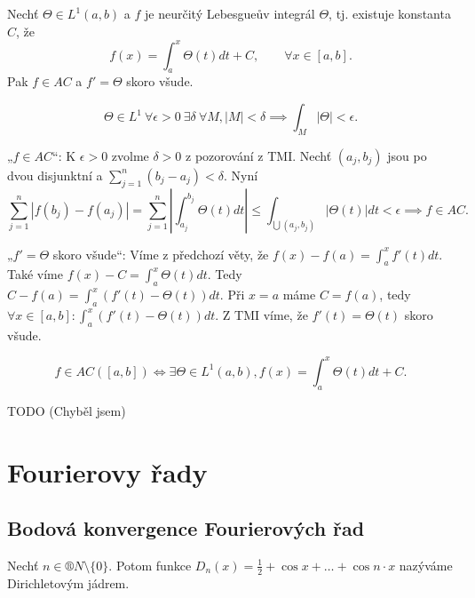 \documentclass[12pt]{article}					%
\begin{document}
	\begin{veta}
		Nechť $\Theta \in L^1(a, b)$ a $f$ je neurčitý Lebesgueův integrál $\Theta$, tj. existuje konstanta $C$, že
		$$ f(x) = \int_a^x \Theta(t) dt + C, \qquad \forall x \in [a, b]. $$
		Pak $f \in AC$ a $f' = \Theta$ skoro všude.

		\begin{tvrzeni}
			$$ \Theta \in L^1\ \forall \epsilon > 0\ \exists \delta\ \forall M, |M| < \delta \implies \int_M |\Theta| < \epsilon. $$
		\end{tvrzeni}

		\begin{dukazin}
			„$f \in AC$“: K $\epsilon > 0$ zvolme $\delta > 0$ z pozorování z TMI. Nechť $(a_j, b_j)$ jsou po dvou disjunktní a $\sum_{j=1}^n (b_j - a_j) < \delta$. Nyní
			$$ \sum_{j=1}^n |f(b_j) - f(a_j)| = \sum_{j=1}^n |\int_{a_j}^{b_j} \Theta(t) dt| ≤ \int_{\bigcup (a_j, b_j)} |\Theta(t)| dt < \epsilon \implies f \in AC. $$

			„$f' = \Theta$ skoro všude“: Víme z předchozí věty, že $f(x) - f(a) = \int_a^x f'(t) dt$. Také víme $f(x) - C = \int_a^x \Theta(t) dt$. Tedy $C - f(a) = \int_a^x (f'(t) - \Theta(t)) dt$. Při $x = a$ máme $C = f(a)$, tedy $\forall x \in [a, b]: \int_a^x (f'(t) - \Theta(t)) dt$. Z TMI víme, že $f'(t) = \Theta(t)$ skoro všude.
		\end{dukazin}
	\end{veta}

	\begin{dusledek}
		$$ f \in AC ([a, b]) \Leftrightarrow \exists \Theta \in L^1(a, b), f(x) = \int_a^x \Theta(t) dt + C. $$
	\end{dusledek}


TODO (Chyběl jsem)


\section{Fourierovy řady}
	\subsection{Bodová konvergence Fourierových řad}
	\begin{definice}
		Nechť $n \in ®N \setminus \{0\}$. Potom funkce $D_n(x) = \frac{1}{2} + \cos x + … + \cos n · x$ nazýváme Dirichletovým jádrem.
	\end{definice}
\end{document}
